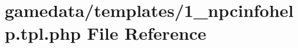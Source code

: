 \hypertarget{1__npcinfohelp_8tpl_8php}{\section{gamedata/templates/1\+\_\+npcinfohelp.tpl.\+php File Reference}
\label{1__npcinfohelp_8tpl_8php}
}
